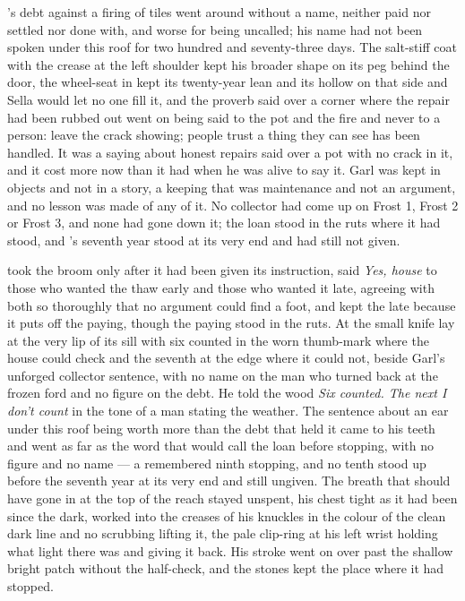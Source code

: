 's debt against a firing of tiles went around without a name, neither paid nor settled nor done with, and worse for being uncalled; his name had not been spoken under this roof for two hundred and seventy-three days. The salt-stiff coat with the crease at the left shoulder kept his broader shape on its peg behind the door, the wheel-seat in  kept its twenty-year lean and its hollow on that side and Sella would let no one fill it, and the proverb said over a corner where the repair had been rubbed out went on being said to the pot and the fire and never to a person: leave the crack showing; people trust a thing they can see has been handled. It was a saying about honest repairs said over a pot with no crack in it, and it cost more now than it had when he was alive to say it. Garl was kept in objects and not in a story, a keeping that was maintenance and not an argument, and no lesson was made of any of it. No collector had come up  on Frost 1, Frost 2 or Frost 3, and none had gone down it; the loan stood in the ruts where it had stood, and 's seventh year stood at its very end and had still not given.

 took the broom only after it had been given its instruction, said \emph{Yes, house} to those who wanted the thaw early and those who wanted it late, agreeing with both so thoroughly that no argument could find a foot, and kept the late because it puts off the paying, though the paying stood in the ruts. At  the small knife lay at the very lip of its sill with six counted in the worn thumb-mark where the house could check and the seventh at the edge where it could not, beside Garl's unforged collector sentence, with no name on the man who turned back at the frozen ford and no figure on the debt. He told the wood \emph{Six counted. The next I don't count} in the tone of a man stating the weather. The sentence about an ear under this roof being worth more than the debt that held it came to his teeth and went as far as the word that would call the loan before stopping, with no figure and no name --- a remembered ninth stopping, and no tenth stood up before the seventh year at its very end and still ungiven. The breath that should have gone in at the top of the reach stayed unspent, his chest tight as it had been since the dark,  worked into the creases of his knuckles in the colour of the clean dark line and no scrubbing lifting it, the pale clip-ring at his left wrist holding what light there was and giving it back. His stroke went on over  past the shallow bright patch without the half-check, and the stones kept the place where it had stopped.

